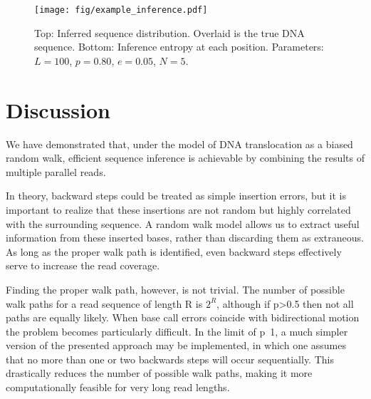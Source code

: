 \documentclass[12pt]{article}
\begin{document}
\begin{figure}
\centering
\texttt{[image: fig/example\_inference.pdf]}
\caption{Top: Inferred sequence distribution. Overlaid is the true DNA sequence. Bottom: Inference entropy at each position. Parameters: $L=100$, $p=0.80$, $e=0.05$, $N=5$.}
\label{fig:example_inference}
\end{figure}



\section{Discussion}
We have demonstrated that, under the model of DNA translocation as a biased random walk, efficient sequence inference is achievable by combining the results of multiple parallel reads.

In theory, backward steps could be treated as simple insertion errors, but it is important to realize that these insertions are not random but highly correlated with the surrounding sequence. A random walk model allows us to extract useful information from these inserted bases, rather than discarding them as extraneous. As long as the proper walk path is identified, even backward steps effectively serve to increase the read coverage.

Finding the proper walk path, however, is not trivial. The number of possible walk paths for a read sequence of length R is $2^R$, although if p>0.5 then not all paths are equally likely. When base call errors coincide with bidirectional motion the problem becomes particularly difficult. In the limit of p~1, a much simpler version of the presented approach may be implemented, in which one assumes that no more than one or two backwards steps will occur sequentially. This drastically reduces the number of possible walk paths, making it more computationally feasible for very long read lengths.
\end{document}
